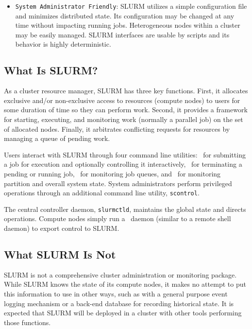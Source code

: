 \documentclass[10pt,onecolumn,times]{llncs}
\begin{document}
{\begin{itemize}
\item {\tt System Administrator Friendly}: SLURM utilizes
a simple configuration file and minimizes distributed state.
Its configuration may be changed at any time without impacting running
jobs.  Heterogeneous nodes within a cluster may be easily managed.  SLURM
interfaces are usable by scripts and its behavior is highly deterministic.

\end{itemize}

\subsection{What Is SLURM?}

As a cluster resource manager, SLURM has three key functions.  First,
it allocates exclusive and/or non-exclusive access to resources (compute
nodes) to users for some duration of time so they can perform work.
Second, it provides a framework for starting, executing, and monitoring
work (normally a parallel job) on the set of allocated nodes.  Finally,
it arbitrates conflicting requests for resources by managing a queue of
pending work.

Users interact with SLURM through four command line utilities: \srun\
for submitting a job for execution and optionally controlling it
interactively, \scancel\ for terminating a pending or running job,
\squeue\ for monitoring job queues, and \sinfo\ for monitoring partition
and overall system state.  System administrators perform privileged
operations through an additional command line utility, {\tt scontrol}.

The central controller daemon, {\tt slurmctld}, maintains the global
state and directs operations.  Compute nodes simply run a \slurmd\ daemon
(similar to a remote shell daemon) to export control to SLURM.

\subsection{What SLURM Is Not}

SLURM is not a comprehensive cluster administration or monitoring package.
While SLURM knows the state of its compute nodes, it makes no attempt
to put this information to use in other ways, such as with a general
purpose event logging mechanism or a back-end database for recording
historical state.  It is expected that SLURM will be deployed in a
cluster with other tools performing those functions.

}
\end{document}

